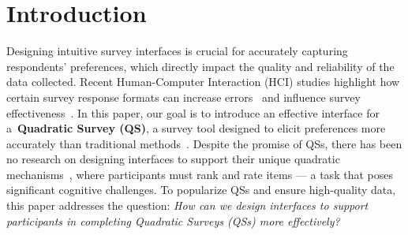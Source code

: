 \section{Introduction}



Designing intuitive survey interfaces is crucial for accurately capturing respondents' preferences, which directly impact the quality and reliability of the data collected. Recent Human-Computer Interaction (HCI) studies highlight how certain survey response formats can increase errors~\cite{pielotDidYouMisclick2024, kimComparingDataChatbot2019} and influence survey effectiveness~\cite{ugur2015evaluating}. In this paper, our goal is to introduce an effective interface for a~\textbf{Quadratic Survey (QS)}, a survey tool designed to elicit preferences more accurately than traditional methods~\cite{chengCanShowWhat2021}. Despite the promise of QSs, there has been no research on designing interfaces to support their unique quadratic mechanisms~\cite{grovesOptimalAllocationPublic1977}, where participants must rank and rate items --- a task that poses significant cognitive challenges. To popularize QSs and ensure high-quality data, this paper addresses the question: \textit{How can we design interfaces to support participants in completing Quadratic Surveys (QSs) more effectively?}

